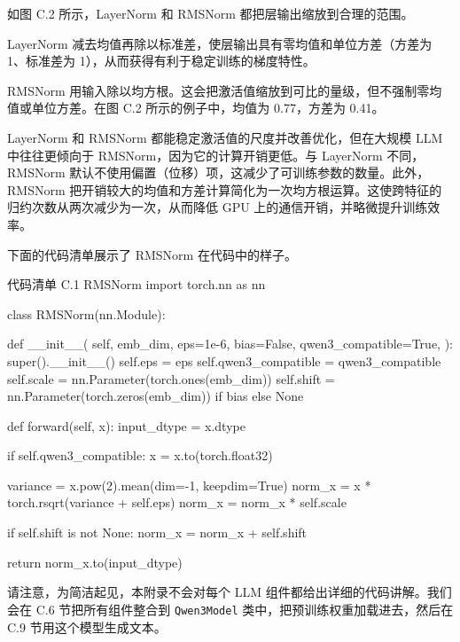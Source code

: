 
如图 C.2 所示，LayerNorm 和 RMSNorm 都把层输出缩放到合理的范围。

LayerNorm 减去均值再除以标准差，使层输出具有零均值和单位方差（方差为 1、标准差为 1），从而获得有利于稳定训练的梯度特性。

RMSNorm 用输入除以均方根。这会把激活值缩放到可比的量级，但不强制零均值或单位方差。在图 C.2 所示的例子中，均值为 0.77，方差为 0.41。

LayerNorm 和 RMSNorm 都能稳定激活值的尺度并改善优化，但在大规模 LLM 中往往更倾向于 RMSNorm，因为它的计算开销更低。与 LayerNorm 不同，RMSNorm 默认不使用偏置（位移）项，这减少了可训练参数的数量。此外，RMSNorm 把开销较大的均值和方差计算简化为一次均方根运算。这使跨特征的归约次数从两次减少为一次，从而降低 GPU 上的通信开销，并略微提升训练效率。

下面的代码清单展示了 RMSNorm 在代码中的样子。

\begin{codeboxt}{代码清单 C.1 RMSNorm}
import torch.nn as nn

class RMSNorm(nn.Module):

    def __init__(
        self,
        emb_dim,
        eps=1e-6,
        bias=False,
        qwen3_compatible=True,
    ):
        super().__init__()
        self.eps = eps
        self.qwen3_compatible = qwen3_compatible
        self.scale = nn.Parameter(torch.ones(emb_dim))
        self.shift = nn.Parameter(torch.zeros(emb_dim)) if bias else None

    def forward(self, x):
        input_dtype = x.dtype

        if self.qwen3_compatible:
            x = x.to(torch.float32)

        variance = x.pow(2).mean(dim=-1, keepdim=True)
        norm_x = x * torch.rsqrt(variance + self.eps)
        norm_x = norm_x * self.scale

        if self.shift is not None:
            norm_x = norm_x + self.shift

        return norm_x.to(input_dtype)
\end{codeboxt}

请注意，为简洁起见，本附录不会对每个 LLM 组件都给出详细的代码讲解。我们会在 C.6 节把所有组件整合到 \texttt{Qwen3Model} 类中，把预训练权重加载进去，然后在 C.9 节用这个模型生成文本。

